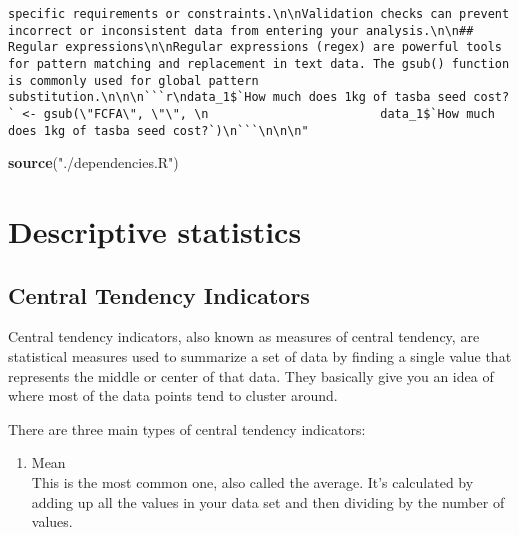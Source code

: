 \documentclass[
]{book}
\newenvironment{Shaded}{\begin{snugshade}}{\end{snugshade}}
\newcommand{\AttributeTok}[1]{\textcolor[rgb]{0.13,0.29,0.53}{#1}}
\newcommand{\CommentTok}[1]{\textcolor[rgb]{0.56,0.35,0.01}{\textit{#1}}}
\newcommand{\FunctionTok}[1]{\textcolor[rgb]{0.13,0.29,0.53}{\textbf{#1}}}
\newcommand{\NormalTok}[1]{#1}
\newcommand{\SpecialCharTok}[1]{\textcolor[rgb]{0.81,0.36,0.00}{\textbf{#1}}}
\newcommand{\StringTok}[1]{\textcolor[rgb]{0.31,0.60,0.02}{#1}}
\providecommand{\tightlist}{%
  \setlength{\itemsep}{0pt}\setlength{\parskip}{0pt}}
\begin{document}
\begin{verbatim}
specific requirements or constraints.\n\nValidation checks can prevent incorrect or inconsistent data from entering your analysis.\n\n## Regular expressions\n\nRegular expressions (regex) are powerful tools for pattern matching and replacement in text data. The gsub() function is commonly used for global pattern substitution.\n\n\n```r\ndata_1$`How much does 1kg of tasba seed cost?` <- gsub(\"FCFA\", \"\", \n                        data_1$`How much does 1kg of tasba seed cost?`)\n```\n\n\n"
\end{verbatim}

\begin{Shaded}
\begin{Highlighting}[]
\FunctionTok{source}\NormalTok{(}\StringTok{"./dependencies.R"}\NormalTok{)}
\end{Highlighting}
\end{Shaded}

\hypertarget{descriptive-statistics}{%
\chapter{Descriptive statistics}\label{descriptive-statistics}}

\hypertarget{central-tendency-indicators}{%
\section{Central Tendency Indicators}\label{central-tendency-indicators}}

Central tendency indicators, also known as measures of central tendency, are statistical measures used to summarize a set of data by finding a single value that represents the middle or center of that data. They basically give you an idea of where most of the data points tend to cluster around.

There are three main types of central tendency indicators:

\begin{enumerate}
\def\labelenumi{\arabic{enumi}.}
\tightlist
\item
  Mean\\
  This is the most common one, also called the average. It's calculated by adding up all the values in your data set and then dividing by the number of values.\\
\end{enumerate}

\begin{Shaded}
\end{Shaded}
\end{document}
